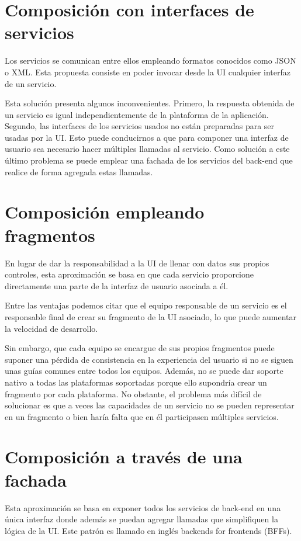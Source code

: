 \documentclass[11pt,a4paper]{article}
\begin{document}
\section{Composición con interfaces de servicios}

Los servicios se comunican entre ellos empleando formatos conocidos como JSON o XML. Esta propuesta consiste en poder invocar desde la UI cualquier interfaz de un servicio.

Esta solución presenta algunos inconvenientes. Primero, la respuesta obtenida de un servicio es igual independientemente de la plataforma de la aplicación. Segundo, las interfaces de los servicios usados no están preparadas para ser usadas por la UI. Esto puede conducirnos a que para componer una interfaz de usuario sea necesario hacer múltiples llamadas al servicio. Como solución a este último problema se puede emplear una fachada de los servicios del back-end que realice de forma agregada estas llamadas. 

\section{Composición empleando fragmentos}

En lugar de dar la responsabilidad a la UI de llenar con datos sus propios controles, esta aproximación se basa en que cada servicio proporcione directamente una parte de la interfaz de usuario asociada a él.

Entre las ventajas podemos citar que el equipo responsable de un servicio es el responsable final de crear su fragmento de la UI asociado, lo que puede aumentar la velocidad de desarrollo.

Sin embargo, que cada equipo se encargue de sus propios fragmentos puede suponer una pérdida de consistencia en la experiencia del usuario si no se siguen unas guías comunes entre todos los equipos. Además, no se puede dar soporte nativo a todas las plataformas soportadas porque ello supondría crear un fragmento por cada plataforma. No obstante, el problema más difícil de solucionar es que a veces las capacidades de un servicio no se pueden representar en un fragmento o bien haría falta que en él participasen múltiples servicios.

\section{Composición a través de una fachada}

Esta aproximación se basa en exponer todos los servicios de back-end en una única interfaz donde además se puedan agregar llamadas que simplifiquen la lógica de la UI. Este patrón es llamado en inglés backends for frontends (BFFs).
\end{document}
